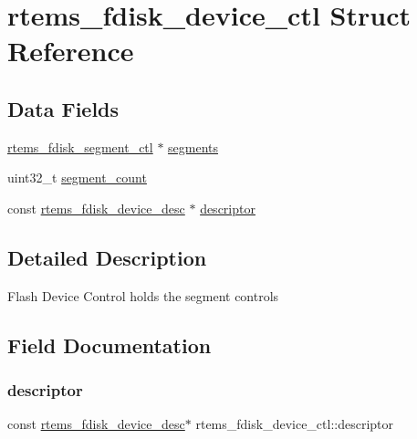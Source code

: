 \hypertarget{structrtems__fdisk__device__ctl}{}\section{rtems\+\_\+fdisk\+\_\+device\+\_\+ctl Struct Reference}
\label{structrtems__fdisk__device__ctl}
\subsection*{Data Fields}
\begin{DoxyCompactItemize}
\item 
\mbox{\hyperlink{structrtems__fdisk__segment__ctl}{rtems\+\_\+fdisk\+\_\+segment\+\_\+ctl}} $\ast$ \mbox{\hyperlink{structrtems__fdisk__device__ctl_aaafa94fb922fde1ec6343f8e07c23720}{segments}}
\item 
uint32\+\_\+t \mbox{\hyperlink{structrtems__fdisk__device__ctl_a68aeeb2255b4d63dd9bb8867fd597053}{segment\+\_\+count}}
\item 
const \mbox{\hyperlink{structrtems__fdisk__device__desc}{rtems\+\_\+fdisk\+\_\+device\+\_\+desc}} $\ast$ \mbox{\hyperlink{structrtems__fdisk__device__ctl_a1e18d56712c76694f7633edf1f418e72}{descriptor}}
\end{DoxyCompactItemize}


\subsection{Detailed Description}
Flash Device Control holds the segment controls 

\subsection{Field Documentation}
\mbox{\label{structrtems__fdisk__device__ctl_a1e18d56712c76694f7633edf1f418e72}} 
\subsubsection{\texorpdfstring{descriptor}{descriptor}}
{\footnotesize\ttfamily const \mbox{\hyperlink{structrtems__fdisk__device__desc}{rtems\+\_\+fdisk\+\_\+device\+\_\+desc}}$\ast$ rtems\+\_\+fdisk\+\_\+device\+\_\+ctl\+::descriptor}

